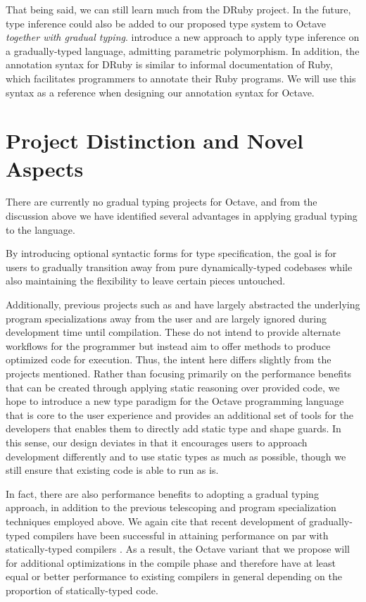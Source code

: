 That being said, we can still learn much from the DRuby project. In the future, type inference could also be added to our proposed type system to Octave \emph{together with gradual typing}. \citet{garcia2015principal} introduce a new approach to apply type inference on a gradually-typed language, admitting parametric polymorphism. In addition, the annotation syntax for DRuby is similar to informal documentation of Ruby, which facilitates programmers to annotate their Ruby programs. We will use this syntax as a reference when designing our annotation syntax for Octave.

\section{Project Distinction and Novel Aspects}
There are currently no gradual typing projects for Octave, and from the discussion above we have identified several advantages in applying gradual typing to the language.

By introducing optional syntactic forms for type specification, the goal is for users to gradually transition away from pure dynamically-typed codebases while also maintaining the flexibility to leave certain pieces untouched.

Additionally, previous projects such as \citet{chauhan2003type} and \citet{olmos2003turning} have largely abstracted the underlying program specializations away from the user and are largely ignored during development time until compilation. These do not intend to provide alternate workflows for the programmer but instead aim to offer methods to produce optimized code for execution. Thus, the intent here differs slightly from the projects mentioned. Rather than focusing primarily on the performance benefits that can be created through applying static reasoning over provided code, we hope to introduce a new type paradigm for the Octave programming language that is core to the user experience and provides an additional set of tools for the developers that enables them to directly add static type and shape guards. In this sense, our design deviates in that it encourages users to approach development differently and to use static types as much as possible, though we still ensure that existing code is able to run as is.

In fact, there are also performance benefits to adopting a gradual typing approach, in addition to the previous telescoping and program specialization techniques employed above. We again cite that recent development of gradually-typed compilers have been successful in attaining performance on par with statically-typed compilers \cite{kuhlenschmidt2018efficient}. As a result, the Octave variant that we propose will for additional optimizations in the compile phase and therefore have at least equal or better performance to existing compilers in general depending on the proportion of statically-typed code.

